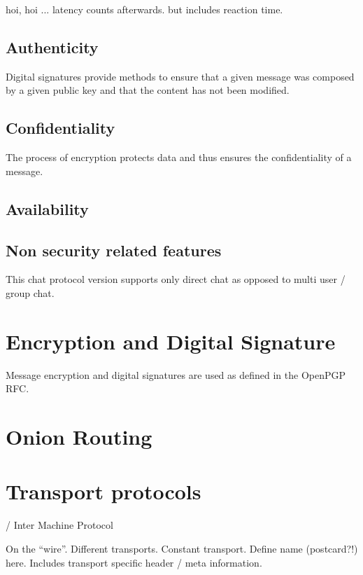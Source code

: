 hoi, hoi ... latency counts afterwards. but includes reaction time.

\subsection{Authenticity}
Digital signatures provide methods to ensure that a given message
was composed by a given public key and that the content has not been
modified.
\subsection{Confidentiality}
The process of encryption protects data and thus ensures the
confidentiality of a message.
\subsection{Availability}
\subsection{Non security related features}
This chat protocol version supports only direct chat as opposed to
multi user / group chat.
\section{Encryption and Digital Signature}
Message encryption and digital signatures are
used as defined in the OpenPGP RFC.\cite{rfc2440}


\section{Onion Routing}

\section{Transport protocols}
 /  Inter Machine Protocol

On the "`wire"'. Different transports. Constant transport.
Define name (postcard?!) here. Includes transport specific
header / meta information.

